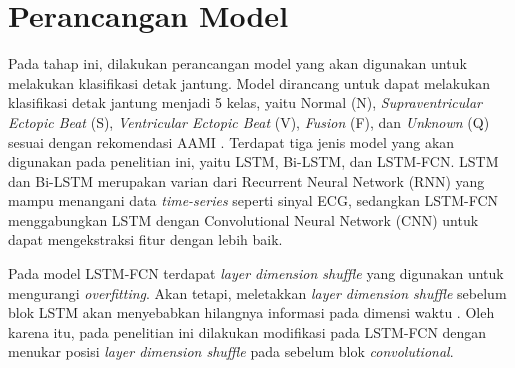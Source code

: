 \section{Perancangan Model}
\label{subsec: metodologi-pembuatan-model}
Pada tahap ini, dilakukan perancangan model yang akan digunakan untuk melakukan klasifikasi detak jantung.
Model dirancang untuk dapat melakukan klasifikasi detak jantung menjadi 5 kelas, yaitu Normal (N), \textit{Supraventricular Ectopic Beat} (S), \textit{Ventricular Ectopic Beat} (V), \textit{Fusion} (F), dan \textit{Unknown} (Q) sesuai dengan rekomendasi AAMI \parencite{associationfortheadvancementofmedicalinstrumentationTestingReportingPerformance1998}.
Terdapat tiga jenis model yang akan digunakan pada penelitian ini, yaitu LSTM, Bi-LSTM, dan LSTM-FCN.
LSTM dan Bi-LSTM merupakan varian dari Recurrent Neural Network (RNN) yang mampu menangani data \textit{time-series} seperti sinyal ECG, sedangkan LSTM-FCN menggabungkan LSTM dengan Convolutional Neural Network (CNN) 
untuk dapat mengekstraksi fitur dengan lebih baik.

Pada model LSTM-FCN terdapat \textit{layer dimension shuffle} yang digunakan untuk mengurangi \textit{overfitting}.
Akan tetapi, meletakkan \textit{layer dimension shuffle} sebelum blok LSTM akan menyebabkan hilangnya informasi pada dimensi waktu \parencite{8713870}.
Oleh karena itu, pada penelitian ini dilakukan modifikasi pada LSTM-FCN dengan menukar posisi \textit{layer dimension shuffle} pada sebelum blok \textit{convolutional}.


